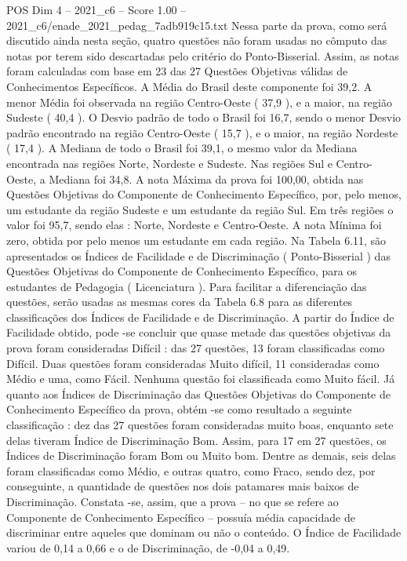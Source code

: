 \begin{textsample}{POS Dim 4 – 2021\_c6 – Score 1.00 – 2021\_c6/enade\_2021\_pedag\_7adb919c15.txt}
Nessa parte da prova, como será discutido ainda nesta seção, quatro questões não foram usadas no cômputo das notas por terem sido descartadas pelo critério do Ponto-Bisserial.
Assim, as notas foram calculadas com base em 23 das 27 Questões Objetivas válidas de Conhecimentos Específicos.
A Média do Brasil deste componente foi 39,2.
A menor Média foi observada na região Centro-Oeste ( 37,9 ), e a maior, na região Sudeste ( 40,4 ).
O Desvio padrão de todo o Brasil foi 16,7, sendo o menor Desvio padrão encontrado na região Centro-Oeste ( 15,7 ), e o maior, na região Nordeste ( 17,4 ).
A Mediana de todo o Brasil foi 39,1, o mesmo valor da Mediana encontrada nas regiões Norte, Nordeste e Sudeste.
Nas regiões Sul e Centro-Oeste, a Mediana foi 34,8.
A nota Máxima da prova foi 100,00, obtida nas Questões Objetivas do Componente de Conhecimento Específico, por, pelo menos, um estudante da região Sudeste e um estudante da região Sul.
Em três regiões o valor foi 95,7, sendo elas : Norte, Nordeste e Centro-Oeste.
A nota Mínima foi zero, obtida por pelo menos um estudante em cada região.
Na Tabela 6.11, são apresentados os Índices de Facilidade e de Discriminação ( Ponto-Bisserial ) das Questões Objetivas do Componente de Conhecimento Específico, para os estudantes de Pedagogia ( Licenciatura ).
Para facilitar a diferenciação das questões, serão usadas as mesmas cores da Tabela 6.8 para as diferentes classificações dos Índices de Facilidade e de Discriminação.
A partir do Índice de Facilidade obtido, pode -se concluir que quase metade das questões objetivas da prova foram consideradas Difícil : das 27 questões, 13 foram classificadas como Difícil.
Duas questões foram consideradas Muito difícil, 11 consideradas como Médio e uma, como Fácil.
Nenhuma questão foi classificada como Muito fácil.
Já quanto aos Índices de Discriminação das Questões Objetivas do Componente de Conhecimento Específico da prova, obtém -se como resultado a seguinte classificação : dez das 27 questões foram consideradas muito boas, enquanto sete delas tiveram Índice de Discriminação Bom.
Assim, para 17 em 27 questões, os Índices de Discriminação foram Bom ou Muito bom.
Dentre as demais, seis delas foram classificadas como Médio, e outras quatro, como Fraco, sendo dez, por conseguinte, a quantidade de questões nos dois patamares mais baixos de Discriminação.
Constata -se, assim, que a prova – no que se refere ao Componente de Conhecimento Específico – possuía média capacidade de discriminar entre aqueles que dominam ou não o conteúdo.
O Índice de Facilidade variou de 0,14 a 0,66 e o de Discriminação, de -0,04 a 0,49.

\end{textsample}
